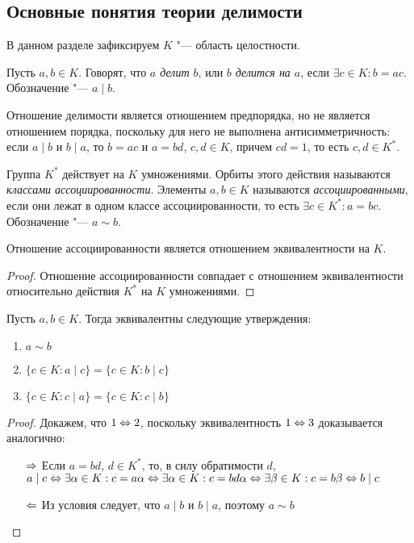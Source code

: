\subsection{Основные понятия теории делимости}

В данном разделе зафиксируем $K$ "--- область целостности.

\begin{definition}
	Пусть $a, b \in K$. Говорят, что \textit{$a$ делит $b$}, или \textit{$b$ делится на $a$}, если $\exists c \in K: b = ac$. Обозначение "--- $a \mid b$.
\end{definition}

\begin{note}
	Отношение делимости является отношением предпорядка, но не является отношением порядка, поскольку для него не выполнена антисимметричность: если $a \mid b$ и $b \mid a$, то $b = ac$ и $a = bd$, $c, d \in K$, причем $cd = 1$, то есть $c, d \in K^*$.
\end{note}

\begin{definition}
	Группа $K^*$ действует на $K$ умножениями. Орбиты этого действия называются \textit{классами ассоциированности}. Элементы $a, b \in K$ называются \textit{ассоциированными}, если они лежат в одном классе ассоциированности, то есть $\exists c \in K^*: a = bc$. Обозначение "--- $a \sim b$.
\end{definition}

\begin{proposition}
	Отношение ассоциированности является отношением эквивалентности на $K$.
\end{proposition}

\begin{proof}
	Отношение ассоциированности совпадает с отношением эквивалентности относительно действия $K^*$ на $K$ умножениями.
\end{proof}

\begin{proposition}
	Пусть $a, b \in K$. Тогда эквивалентны следующие утверждения:
	\begin{enumerate}
		\item $a \sim b$
		\item $\{c \in K: a \mid c\} = \{c \in K: b \mid c\}$
		\item $\{c \in K: c \mid a\} = \{c \in K: c \mid b\}$
	\end{enumerate}
\end{proposition}

\begin{proof} Докажем, что $1 \Leftrightarrow 2$, поскольку эквивалентность $1 \Leftrightarrow 3$ доказывается аналогично:
	\begin{itemize}
		\item[$\Rightarrow$] Если $a = bd$, $d \in K^*$, то, в силу обратимости $d$, $a \mid c \Leftrightarrow \exists \alpha \in K: c = a\alpha \Leftrightarrow \exists \alpha \in K: c = bd\alpha \Leftrightarrow \exists \beta \in K: c = b\beta \Leftrightarrow b \mid c$
		\item[$\Leftarrow$] Из условия следует, что $a \mid b$ и $b \mid a$, поэтому $a \sim b$
	\end{itemize}
\end{proof}

